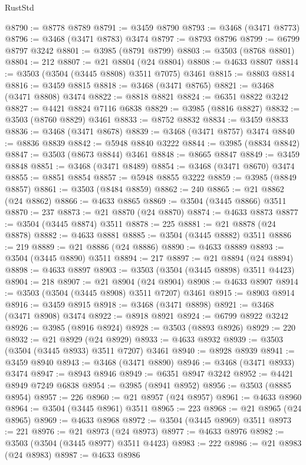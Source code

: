 \begin{lexlean}{RustStd}
\begin{coremodule}
@8790 := @8778 @8789
@8791 := @3459 @8790
@8793 := @3468 (@3471 @8773)
@8796 := @3468 (@3471 @8783) @3474
@8797 := @8793 @8796
@8799 := @6799 @8797 @3242
@8801 := @3985 (@8791 @8799)
@8803 := @3503 (@8768 @8801)
@8804 := 212
@8807 := @21 @8804 (@24 @8804)
@8808 := @4633 @8807
@8814 := @3503 (@3504 (@3445 @8808) @3511 @7075) @3461
@8815 := @8803 @8814
@8816 := @3459 @8815
@8818 := @3468 (@3471 @8765)
@8821 := @3468 (@3471 @8808) @3474
@8822 := @8818 @8821
@8824 := @6351 @8822 @3242
@8827 := @4421 @8824 @7116 @6838
@8829 := @3985 (@8816 @8827)
@8832 := @3503 (@8760 @8829) @3461
@8833 := @8752 @8832
@8834 := @3459 @8833
@8836 := @3468 (@3471 @8678)
@8839 := @3468 (@3471 @8757) @3474
@8840 := @8836 @8839
@8842 := @5948 @8840 @3222
@8844 := @3985 (@8834 @8842)
@8847 := @3503 (@8673 @8844) @3461
@8848 := @8665 @8847
@8849 := @3459 @8848
@8851 := @3468 (@3471 @8489)
@8854 := @3468 (@3471 @8670) @3474
@8855 := @8851 @8854
@8857 := @5948 @8855 @3222
@8859 := @3985 (@8849 @8857)
@8861 := @3503 (@8484 @8859)
@8862 := 240
@8865 := @21 @8862 (@24 @8862)
@8866 := @4633 @8865
@8869 := @3504 (@3445 @8866) @3511
@8870 := 237
@8873 := @21 @8870 (@24 @8870)
@8874 := @4633 @8873
@8877 := @3504 (@3445 @8874) @3511
@8878 := 225
@8881 := @21 @8878 (@24 @8878)
@8882 := @4633 @8881
@8885 := @3504 (@3445 @8882) @3511
@8886 := 219
@8889 := @21 @8886 (@24 @8886)
@8890 := @4633 @8889
@8893 := @3504 (@3445 @8890) @3511
@8894 := 217
@8897 := @21 @8894 (@24 @8894)
@8898 := @4633 @8897
@8903 := @3503 (@3504 (@3445 @8898) @3511 @4423)
@8904 := 218
@8907 := @21 @8904 (@24 @8904)
@8908 := @4633 @8907
@8914 := @3503 (@3504 (@3445 @8908) @3511 @7207) @3461
@8915 := @8903 @8914
@8916 := @3459 @8915
@8918 := @3468 (@3471 @8898)
@8921 := @3468 (@3471 @8908) @3474
@8922 := @8918 @8921
@8924 := @6799 @8922 @3242
@8926 := @3985 (@8916 @8924)
@8928 := @3503 (@8893 @8926)
@8929 := 220
@8932 := @21 @8929 (@24 @8929)
@8933 := @4633 @8932
@8939 := @3503 (@3504 (@3445 @8933) @3511 @7207) @3461
@8940 := @8928 @8939
@8941 := @3459 @8940
@8943 := @3468 (@3471 @8890)
@8946 := @3468 (@3471 @8933) @3474
@8947 := @8943 @8946
@8949 := @6351 @8947 @3242
@8952 := @4421 @8949 @7249 @6838
@8954 := @3985 (@8941 @8952)
@8956 := @3503 (@8885 @8954)
@8957 := 226
@8960 := @21 @8957 (@24 @8957)
@8961 := @4633 @8960
@8964 := @3504 (@3445 @8961) @3511
@8965 := 223
@8968 := @21 @8965 (@24 @8965)
@8969 := @4633 @8968
@8972 := @3504 (@3445 @8969) @3511
@8973 := 221
@8976 := @21 @8973 (@24 @8973)
@8977 := @4633 @8976
@8982 := @3503 (@3504 (@3445 @8977) @3511 @4423)
@8983 := 222
@8986 := @21 @8983 (@24 @8983)
@8987 := @4633 @8986

\end{coremodule}
\end{lexlean}
